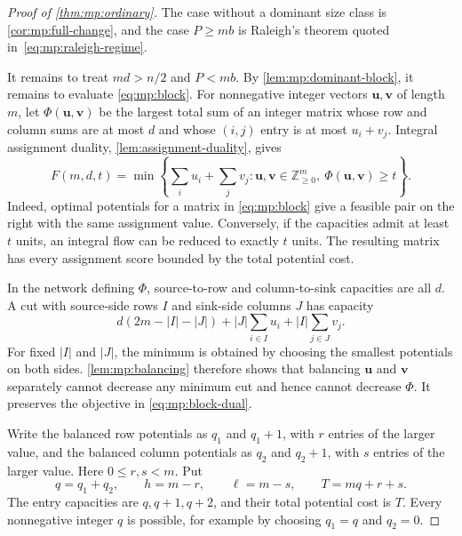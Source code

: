 \documentclass[10pt,a4paper]{amsart}
\numberwithin{equation}{section}
\theoremstyle{definition}
\theoremstyle{remark}
\begin{document}
\begin{proof}[Proof of \cref{thm:mp:ordinary}]
The case without a dominant size class is
\cref{cor:mp:full-change}, and the case $P\ge mb$ is
Raleigh's theorem quoted in~\eqref{eq:mp:raleigh-regime}.

It remains to treat $md>n/2$ and $P<mb$.
By \cref{lem:mp:dominant-block}, it remains
to evaluate \eqref{eq:mp:block}. For nonnegative integer vectors
$\mathbf u,\mathbf v$ of length $m$, let $\Phi(\mathbf u,\mathbf v)$
be the largest total sum of an integer matrix whose row and column
sums are at most $d$ and whose $(i,j)$ entry is at most $u_i+v_j$.
Integral assignment duality, \cref{lem:assignment-duality}, gives
\begin{equation}\label{eq:mp:block-dual}
 F(m,d,t)=\min\left\{\sum_i u_i+\sum_jv_j:
 \mathbf u,\mathbf v\in\mathbb Z_{\ge0}^m,
 \ \Phi(\mathbf u,\mathbf v)\ge t\right\}.
\end{equation}
Indeed, optimal potentials for a matrix in \eqref{eq:mp:block} give
a feasible pair on the right with the same assignment value.
Conversely, if the capacities admit at least $t$ units, an integral
flow can be reduced to exactly $t$ units. The resulting matrix has
every assignment score bounded by the total potential cost.

In the network defining $\Phi$, source-to-row and column-to-sink
capacities are all $d$. A cut with source-side rows $I$ and sink-side
columns $J$ has capacity
\begin{equation}\label{eq:mp:block-cut}
 d(2m-|I|-|J|)+|J|\sum_{i\in I}u_i+|I|\sum_{j\in J}v_j.
\end{equation}
For fixed $|I|$ and $|J|$, the minimum is obtained by choosing the
smallest potentials on both sides. \cref{lem:mp:balancing}
therefore shows that balancing $\mathbf u$ and $\mathbf v$ separately
cannot decrease any minimum cut and hence cannot decrease $\Phi$.
It preserves the objective in \eqref{eq:mp:block-dual}.

Write the balanced row potentials as $q_1$ and $q_1+1$, with $r$ entries
of the larger value, and the balanced column potentials as $q_2$ and
$q_2+1$, with $s$ entries of the larger value. Here $0\le r,s<m$.
Put
\[
 q=q_1+q_2,\qquad h=m-r,\qquad \ell=m-s,\qquad T=mq+r+s.
\]
The entry capacities are $q,q+1,q+2$, and their total potential cost is
$T$. Every nonnegative integer $q$ is possible, for example by choosing
$q_1=q$ and $q_2=0$.


\end{proof}
\end{document}
